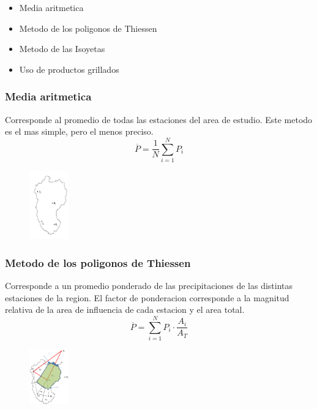 \begin{itemize}
    \item Media aritmetica
    \item Metodo de los poligonos de Thiessen
    \item Metodo de las Isoyetas
    \item Uso de productos grillados
\end{itemize}

\subsubsection{Media aritmetica}

Corresponde al promedio de todas las estaciones del area de estudio. Este metodo es el mas simple, pero el menos preciso.\\

\begin{equation}
    \overline{P} = \frac{1}{N} \sum_{i=1}^{N} P_i
\end{equation}

\begin{figure}[H]
    \centering
    \includegraphics[width=0.15\textwidth]{imagenes/media_aritmetica.png}
    \label{media_aritmetica}
\end{figure}

\subsubsection{Metodo de los poligonos de Thiessen}

Corresponde a un promedio ponderado de las precipitaciones de las distintas estaciones de la region. El factor de ponderacion corresponde a la magnitud relativa de la area de influencia de cada estacion y el area total.\\

\begin{equation}
    \overline{P} = \sum_{i=1}^{N} P_i \cdot \frac{A_i}{A_T}
\end{equation}

\begin{figure}[H]
    \centering
    \includegraphics[width=0.15\textwidth]{imagenes/poligonos_thiessen.png}
    \label{thiessen}
\end{figure}

